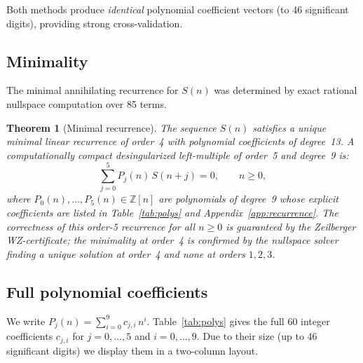 \documentclass[11pt, a4paper]{article}
\newtheorem{theorem}{Theorem}
\begin{document}
Both methods produce \emph{identical} polynomial coefficient vectors (to 46
significant digits), providing strong cross-validation.

\subsection{Minimality}

The minimal annihilating recurrence for $S(n)$ was determined by exact
rational nullspace computation over 85 terms.

\begin{theorem}[Minimal recurrence]\label{thm:recurrence}
The sequence $S(n)$ satisfies a unique minimal linear recurrence of
order~4 with polynomial coefficients of degree~13.
A computationally compact desingularized left-multiple of order~5 and degree~9 is:
\begin{equation}\label{eq:recurrence}
  \sum_{j=0}^{5} P_j(n)\, S(n+j) = 0, \qquad n \ge 0,
\end{equation}
where $P_0(n), \dots, P_5(n) \in \mathbb{Z}[n]$ are polynomials of
degree~9 whose explicit coefficients are listed in
Table~\ref{tab:polys} and Appendix~\ref{app:recurrence}.
The correctness of this order-5 recurrence for all $n\ge 0$ is guaranteed by the
Zeilberger WZ-certificate; the minimality at order~4 is confirmed by the
nullspace solver finding a unique solution at order~4 and none at orders $1,2,3$.
\end{theorem}

\subsection{Full polynomial coefficients}

We write $P_j(n) = \sum_{i=0}^9 c_{j,i}\,n^i$.
Table~\ref{tab:polys} gives the full 60 integer coefficients
$c_{j,i}$ for $j=0,\dots,5$ and $i=0,\dots,9$.  Due to their size
(up to 46 significant digits) we display them in a two-column layout.
\end{document}
